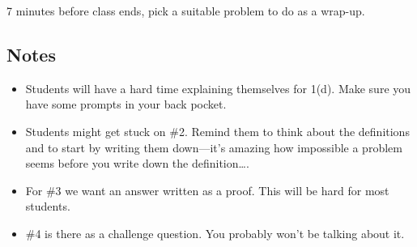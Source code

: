 		7 minutes before class ends, pick a suitable problem to do as a wrap-up.



	
\subsection*{Notes}
	\begin{itemize}
		\item Students will have a hard time explaining themselves for 1(d). Make sure you
			have some prompts in your back pocket.
		\item Students might get stuck on \#2. Remind them to think about the definitions and
			to start by writing them down---it's amazing how impossible a problem seems before
			you write down the definition\ldots.
		\item For \#3 we want an answer written as a proof. This will be hard for most students.
		\item \#4 is there as a challenge question. You probably won't be talking about it.

	\end{itemize}